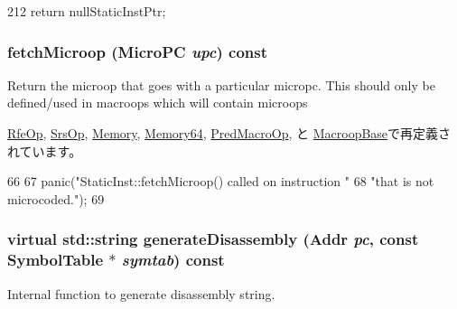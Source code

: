\begin{DoxyCode}
212 { return nullStaticInstPtr; }
\end{DoxyCode}
\hypertarget{classStaticInst_aa5c7e6f7323850b84dbf5b8e47856173}{
\subsubsection[{fetchMicroop}]{ fetchMicroop ({\bf MicroPC} {\em upc}) const}}
\label{classStaticInst_aa5c7e6f7323850b84dbf5b8e47856173}
Return the microop that goes with a particular micropc. This should only be defined/used in macroops which will contain microops 

\hyperlink{classArmISA_1_1RfeOp_ae9e7acd6304ee397f1ab470e283ae76b}{RfeOp}, \hyperlink{classArmISA_1_1SrsOp_ae9e7acd6304ee397f1ab470e283ae76b}{SrsOp}, \hyperlink{classArmISA_1_1Memory_ae9e7acd6304ee397f1ab470e283ae76b}{Memory}, \hyperlink{classArmISA_1_1Memory64_ae9e7acd6304ee397f1ab470e283ae76b}{Memory64}, \hyperlink{classArmISA_1_1PredMacroOp_ae9e7acd6304ee397f1ab470e283ae76b}{PredMacroOp}, と \hyperlink{classX86ISA_1_1MacroopBase_ae9e7acd6304ee397f1ab470e283ae76b}{MacroopBase}で再定義されています。


\begin{DoxyCode}
66 {
67     panic("StaticInst::fetchMicroop() called on instruction "
68           "that is not microcoded.");
69 }
\end{DoxyCode}
\hypertarget{classStaticInst_ab4a569d2623620c04f8a52bbd91d63b9}{
\subsubsection[{generateDisassembly}]{\setlength{\rightskip}{0pt plus 5cm}virtual std::string generateDisassembly ({\bf Addr} {\em pc}, \/  const {\bf SymbolTable} $\ast$ {\em symtab}) const}}
\label{classStaticInst_ab4a569d2623620c04f8a52bbd91d63b9}
Internal function to generate disassembly string. 

